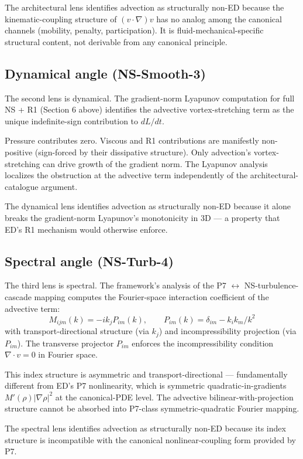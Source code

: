 \documentclass[11pt,a4paper]{article}
\begin{document}
The architectural lens identifies advection as structurally non-ED because the kinematic-coupling structure of $(v\cdot\nabla)v$ has no analog among the canonical channels (mobility, penalty, participation). It is fluid-mechanical-specific structural content, not derivable from any canonical principle.

\subsection{Dynamical angle (NS-Smooth-3)}

The second lens is dynamical. The gradient-norm Lyapunov computation for full NS + R1 (Section 6 above) identifies the advective vortex-stretching term as the unique indefinite-sign contribution to $dL/dt$.

Pressure contributes zero. Viscous and R1 contributions are manifestly non-positive (sign-forced by their dissipative structure). Only advection's vortex-stretching can drive growth of the gradient norm. The Lyapunov analysis localizes the obstruction at the advective term independently of the architectural-catalogue argument.

The dynamical lens identifies advection as structurally non-ED because it alone breaks the gradient-norm Lyapunov's monotonicity in 3D --- a property that ED's R1 mechanism would otherwise enforce.

\subsection{Spectral angle (NS-Turb-4)}

The third lens is spectral. The framework's analysis of the P7 $\leftrightarrow$ NS-turbulence-cascade mapping computes the Fourier-space interaction coefficient of the advective term:
\[
M_{ijm}(k) = -i k_j P_{im}(k), \qquad P_{im}(k) = \delta_{im} - k_i k_m/k^2
\]
with transport-directional structure (via $k_j$) and incompressibility projection (via $P_{im}$). The transverse projector $P_{im}$ enforces the incompressibility condition $\nabla\cdot v = 0$ in Fourier space.

This index structure is asymmetric and transport-directional --- fundamentally different from ED's P7 nonlinearity, which is symmetric quadratic-in-gradients $M'(\rho)|\nabla\rho|^2$ at the canonical-PDE level. The advective bilinear-with-projection structure cannot be absorbed into P7-class symmetric-quadratic Fourier mapping.

The spectral lens identifies advection as structurally non-ED because its index structure is incompatible with the canonical nonlinear-coupling form provided by P7.
\end{document}
